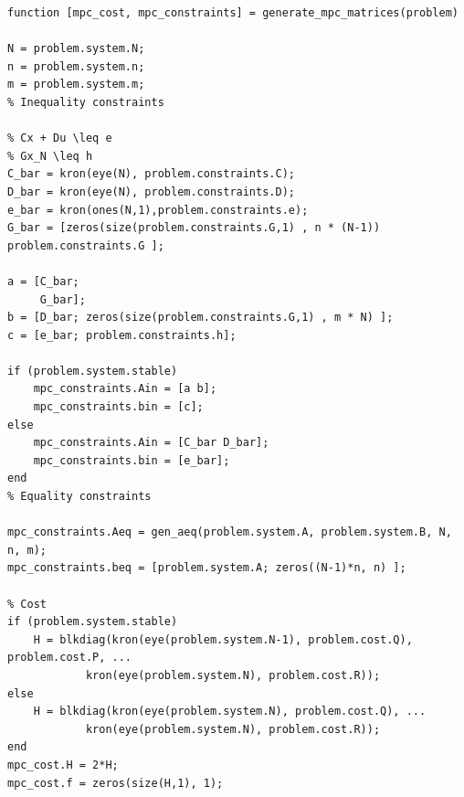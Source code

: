 \begin{lstlisting}[caption={generate\_mpc\_matrices.m}, label={lst:gen_mpc}]
function [mpc_cost, mpc_constraints] = generate_mpc_matrices(problem)

N = problem.system.N;
n = problem.system.n;
m = problem.system.m;
% Inequality constraints

% Cx + Du \leq e
% Gx_N \leq h
C_bar = kron(eye(N), problem.constraints.C);
D_bar = kron(eye(N), problem.constraints.D);
e_bar = kron(ones(N,1),problem.constraints.e);
G_bar = [zeros(size(problem.constraints.G,1) , n * (N-1)) problem.constraints.G ];

a = [C_bar; 
     G_bar];
b = [D_bar; zeros(size(problem.constraints.G,1) , m * N) ];
c = [e_bar; problem.constraints.h];

if (problem.system.stable)
    mpc_constraints.Ain = [a b];
    mpc_constraints.bin = [c];
else
    mpc_constraints.Ain = [C_bar D_bar];
    mpc_constraints.bin = [e_bar];
end
% Equality constraints

mpc_constraints.Aeq = gen_aeq(problem.system.A, problem.system.B, N, n, m);
mpc_constraints.beq = [problem.system.A; zeros((N-1)*n, n) ];

% Cost
if (problem.system.stable)
    H = blkdiag(kron(eye(problem.system.N-1), problem.cost.Q), problem.cost.P, ...
            kron(eye(problem.system.N), problem.cost.R));
else        
    H = blkdiag(kron(eye(problem.system.N), problem.cost.Q), ...
            kron(eye(problem.system.N), problem.cost.R));
end        
mpc_cost.H = 2*H;
mpc_cost.f = zeros(size(H,1), 1);
\end{lstlisting}


